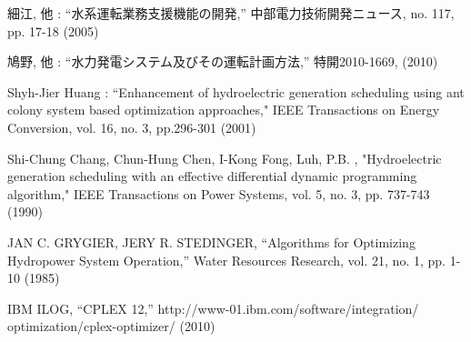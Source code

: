 \begin{thebibliography}{99}


細江, 他 : ``水系運転業務支援機能の開発,'' 中部電力技術開発ニュース, no. 117, pp. 17-18 (2005)

鳩野, 他 : ``水力発電システム及びその運転計画方法,'' 特開2010-1669, (2010)

Shyh-Jier Huang : ``Enhancement of hydroelectric generation scheduling using ant colony system based optimization approaches," IEEE Transactions on Energy Conversion, vol. 16, no. 3, pp.296-301 (2001)

Shi-Chung Chang, Chun-Hung Chen, I-Kong Fong, Luh, P.B. , "Hydroelectric generation scheduling with an effective differential dynamic programming algorithm," IEEE Transactions on Power Systems, vol. 5, no. 3, pp. 737-743 (1990)

JAN C. GRYGIER, JERY R. STEDINGER, ``Algorithms for Optimizing Hydropower System Operation,'' Water Resources Research, vol. 21, no. 1, pp. 1-10 (1985)

IBM ILOG, ``CPLEX 12,'' http://www-01.ibm.com/software/integration/\\
optimization/cplex-optimizer/ (2010)

\end{thebibliography}

\newpage